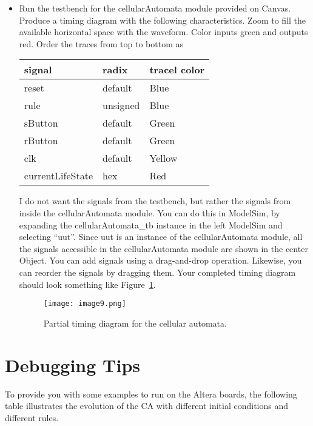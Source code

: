 \begin{itemize}
\item
  Run the testbench for the cellularAutomata module provided on Canvas.
  Produce a timing diagram with the following characteristics. Zoom to
  fill the available horizontal space with the waveform. Color inputs
  green and outputs red. Order the traces from top to bottom as

\begin{tabular}{p{4cm}p{4cm}p{4cm}}
signal		& radix				& tracel color \\ \hline
    reset 			& default 			& Blue  \\ 
    rule 			&  unsigned 			& Blue \\ 
    sButton 			& default 		& Green \\ 
    rButton 			& default 		& Green \\ 
    clk 				& default 		& Yellow \\ 
    currentLifeState 	& hex 			& Red \\
  \end{tabular}


I do not want the signals from the testbench, but rather the signals
from inside the cellularAutomata module. You can do this in ModelSim, by
expanding the cellularAutomata\_tb instance in the left ModelSim and
selecting ``uut''. Since uut is an instance of the cellularAutomata
module, all the signals accessible in the cellularAutomata module are
shown in the center Object. You can add signals using a drag-and-drop
operation. Likewise, you can reorder the signals by dragging them. Your
completed timing diagram should look something like Figure~\ref{fig:caTimeDiag}.

\begin{figure}[ht]
\texttt{[image: image9.png]}
\caption{Partial timing diagram for the cellular automata.}
\label{fig:caTimeDiag}
\end{figure}
\end{itemize}

\section{Debugging Tips}
To provide you with some examples to run on the Altera boards, the
following table illustrates the evolution of the CA with different
initial conditions and different rules.

